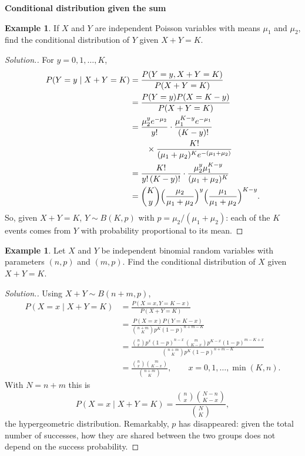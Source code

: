 \documentclass[11pt,a4paper]{article}
\theoremstyle{definition}
\newtheorem{exa}[thm]{Example}
\newenvironment{solution}
  {\renewcommand{\qedsymbol}{}\begin{proof}[\textit{Solution}.]}
  {\end{proof}}
\newcommand{\subhead}[1]{%
  \par\medskip\noindent\textbf{#1}\par\nobreak\smallskip}
\begin{document}
\subhead{Conditional distribution given the sum}
\begin{exa}\label{exa:poisson-given-sum}
If $X$ and $Y$ are independent Poisson variables with means $\mu_1$ and $\mu_2$, find the conditional distribution of $Y$ given $X + Y = K$.
\end{exa}

\begin{solution}
For $y = 0, 1, \dots, K$,
\begin{align*}
P(Y = y \mid X + Y = K) &= \frac{P(Y = y, X + Y = K)}{P(X + Y = K)} \\
&= \frac{P(Y = y)P(X = K - y)}{P(X + Y = K)} \\
&= \frac{\mu_2^ye^{-\mu_2}}{y!}\cdot\frac{\mu_1^{K-y}e^{-\mu_1}}{(K - y)!} \\
&\qquad \times \frac{K!}{(\mu_1 + \mu_2)^Ke^{-(\mu_1+\mu_2)}} \\
&= \frac{K!}{y!\,(K - y)!}\cdot\frac{\mu_2^y\mu_1^{K-y}}{(\mu_1 + \mu_2)^K} \\
&= \binom Ky\Bigl(\frac{\mu_2}{\mu_1 + \mu_2}\Bigr)^y\Bigl(\frac{\mu_1}{\mu_1 + \mu_2}\Bigr)^{K-y} .
\end{align*}
So, given $X + Y = K$, $Y \sim B(K, p)$ with $p = \mu_2/(\mu_1 + \mu_2)$: each of the $K$ events comes from $Y$ with probability proportional to its mean.
\end{solution}

\begin{exa}\label{exa:binomial-given-sum}
Let $X$ and $Y$ be independent binomial random variables with parameters $(n, p)$ and $(m, p)$. Find the conditional distribution of
$X$ given $X + Y = K$.
\end{exa}

\begin{solution}
Using $X + Y \sim B(n + m, p)$,
\begin{align*}
P(X = x \mid X + Y = K) &= \frac{P(X = x, Y = K - x)}{P(X + Y = K)} \\
&= \frac{P(X = x)P(Y = K - x)}{\binom{n+m}Kp^K(1 - p)^{n+m-K}} \\
&= \frac{\binom nxp^x(1 - p)^{n-x}\,\binom m{K-x}p^{K-x}(1 - p)^{m-K+x}}{\binom{n+m}Kp^K(1 - p)^{n+m-K}} \\
&= \frac{\binom nx\binom m{K-x}}{\binom{n+m}K} , \qquad x = 0, 1, \dots, \min(K, n) .
\end{align*}
With $N = n + m$ this is
\[
P(X = x \mid X + Y = K) = \frac{\binom nx\binom{N-n}{K-x}}{\binom NK} ,
\]
the hypergeometric distribution. Remarkably, $p$ has disappeared: given the total number of successes, how they are shared
between the two groups does not depend on the success probability.
\end{solution}
\end{document}

